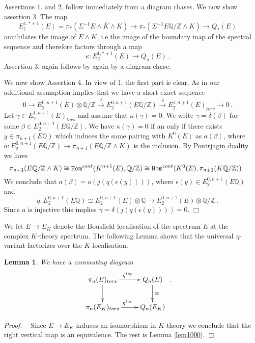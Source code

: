 \documentclass[12pt]{article}
\newtheorem{lem}[theorem]{Lemma}
\def\hB{\hspace*{\fill}$\Box$ \newline\noindent}
\newcommand{\proof}{{\it Proof.$\:\:\:\:$}}
\newcommand{\Z}{{\mathbb{Z}}}
\newcommand{\Q}{{\mathbb{Q}}}
\newcommand{\Hom}{{\tt Hom}}
\begin{document}
Assertions 1. and 2. follow immediately from a diagram chases. We now show assertion 3.
The map
$$E_{1}^{1,*+1}(E)=\pi_{*}(\Sigma^{-1}E\wedge \bar K\wedge K)\to \pi_{*}(\Sigma^{-1}E\Q/\Z\wedge K)\to Q_{*}(E)$$
annihilates the image of $E\wedge K$, i.e the image of the boundary map of the spectral sequence and therefore factors through a map
$$\kappa:E_{2}^{1,*+1}(E)\to Q_{n}(E)\ .$$
Assertion 3.  again follows by again by a diagram chase.

We now show Assertion 4.  In view of 1. the first part is clear. As in \cite[Sec. 5.3]{2009arXiv0912.4875B}   our additional assumption implies that we have a short exact sequence
\begin{equation}\label{eq112}0\to   E_{2}^{0,n+1}(E )\otimes \Q/\Z\stackrel{j}{\to}    E_{2}^{0,n+1}(E\Q/\Z ) \stackrel{\delta}{\to}  E_{2}^{1,n+1}(E)_{tors}\to 0\ .\end{equation}
Let $\gamma\in E^{1,n+1}_{2}(E)_{tors}$ and assume  that
$\kappa(\gamma)=0$.
We write $\gamma=\delta (\beta)$ for some $\beta\in E_{2}^{0,n+1}(E\Q/\Z)$. 
We have $ \kappa(\gamma)=0$ if an only if there exists $y\in \pi_{n+1}(E\Q )$ which induces the same pairing with $K^{0}(E)$ as $a(\beta) $, where
$a:E_{2}^{0,n+1}(E\Q/\Z)\to \pi_{n+1}(E\Q/\Z\wedge K)$ is the inclusion.
By Pontrjagin duality   we have
$$\pi_{n+1}(E\Q/\Z \wedge K )\cong \Hom^{cont}(K^{n+1}(E),\Q/\Z) \cong \Hom^{cont}(K^{0}(E),\pi_{n+1}(K\Q/\Z))\ .$$ We conclude that $a(\beta)=a(j(q(\epsilon(y))))$, where 
$\epsilon(y) \in E_{2}^{0,n+1}(E\Q)$  and $$q:E_{2}^{0,n+1}(E\Q)  \cong E_{2}^{0,n+1}(E)\otimes \Q \to E_{2}^{0,n+1}(E)\otimes \Q/\Z \ .$$ Since $a$ is injective this implies
$\gamma=\delta(j(q(\epsilon(y))))=0$. \hB 

We let $E\to E_{K}$ denote the Bousfield localisation of the spectrum $E$ at the complex $K$-theory spectrum. The following Lemma shows that the universal $\eta$-variant factorizes over the $K$-localisation.

\begin{lem}
We have a commuting diagram
$$\xymatrix{\pi_{n}(E)_{tors}\ar[r]^{\eta^{top}}\ar[d]&Q_{n}(E)\ar[d]^{\cong}\\
\pi_{n}(E_{K})_{tors}\ar[r]^{\eta^{top}}&Q_{n}(E_{K})}\ .$$
 \end{lem}
\proof
Since $E\to E_{K}$ induces an isomorphism in $K$-theory we conclude that the right vertical map is an equivalence. The rest is Lemma \ref{lem1000}. \hB 
\end{document}
